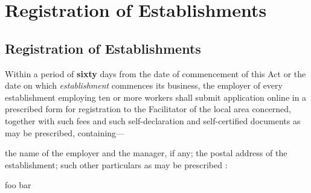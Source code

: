 \documentclass[gaz8,ordinance]{mhact}
\begin{document}
        \chapter{Registration of Establishments} 
        
        \section{Registration of Establishments} 
        
      \begin{subsectionlist}
    
     Within a period of 
   \textbf{sixty}
   days from the date of commencement of this Act or the date on which 
   \emph{establishment}
   commences its business, the employer of every establishment employing ten or more workers shall submit application online in a prescribed form for registration to the Facilitator of the local area concerned, together with such fees and such self-declaration and self-certified documents as may be prescribed, containing---

      \begin{clause}
    
     the name of the employer and the manager, if any;
     the postal address of the establishment;
     such other particulars as may be prescribed :
    \begin{subclause}
       foo
       bar
    \end{subclause}
  \end{clause}
    
       \end{subsectionlist}
    
\end{document}
